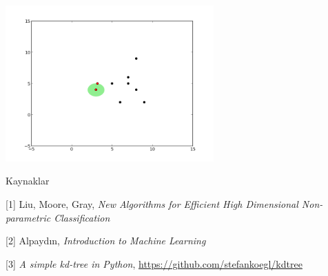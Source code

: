 \documentclass[12pt,fleqn]{article}\usepackage{../../common}
\begin{document}
\includegraphics[height=6cm]{knn9.png}

Kaynaklar

[1] Liu, Moore, Gray, {\em New Algorithms for Efficient High Dimensional
  Non-parametric Classification}

[2] Alpaydın, {\em Introduction to Machine Learning}

[3] {\em A simple kd-tree in Python}, \url{https://github.com/stefankoegl/kdtree}
\end{document}

